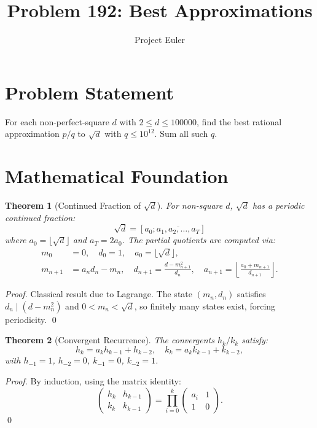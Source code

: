 \documentclass[12pt]{article}
\title{Problem 192: Best Approximations}
\author{Project Euler}
\date{}
\newtheorem{theorem}{Theorem}
\begin{document}
\maketitle

\section{Problem Statement}

For each non-perfect-square $d$ with $2 \leq d \leq 100000$, find the best rational approximation $p/q$ to $\sqrt{d}$ with $q \leq 10^{12}$. Sum all such $q$.

\section{Mathematical Foundation}

\begin{theorem}[Continued Fraction of $\sqrt{d}$]
For non-square $d$, $\sqrt{d}$ has a periodic continued fraction:
\[
\sqrt{d} = [a_0; \overline{a_1, a_2, \ldots, a_T}]
\]
where $a_0 = \lfloor \sqrt{d} \rfloor$ and $a_T = 2a_0$. The partial quotients are computed via:
\begin{align}
m_0 &= 0, \quad d_0 = 1, \quad a_0 = \lfloor \sqrt{d} \rfloor, \\
m_{n+1} &= a_n d_n - m_n, \quad d_{n+1} = \frac{d - m_{n+1}^2}{d_n}, \quad a_{n+1} = \left\lfloor \frac{a_0 + m_{n+1}}{d_{n+1}} \right\rfloor.
\end{align}
\end{theorem}

\begin{proof}
Classical result due to Lagrange. The state $(m_n, d_n)$ satisfies $d_n \mid (d - m_n^2)$ and $0 < m_n < \sqrt{d}$, so finitely many states exist, forcing periodicity. \qed
\end{proof}

\begin{theorem}[Convergent Recurrence]
The convergents $h_k / k_k$ satisfy:
\[
h_k = a_k h_{k-1} + h_{k-2}, \quad k_k = a_k k_{k-1} + k_{k-2},
\]
with $h_{-1} = 1$, $h_{-2} = 0$, $k_{-1} = 0$, $k_{-2} = 1$.
\end{theorem}

\begin{proof}
By induction, using the matrix identity:
\[
\begin{pmatrix} h_k & h_{k-1} \\ k_k & k_{k-1} \end{pmatrix} = \prod_{i=0}^{k} \begin{pmatrix} a_i & 1 \\ 1 & 0 \end{pmatrix}.
\]
\qed
\end{proof}
\end{document}
